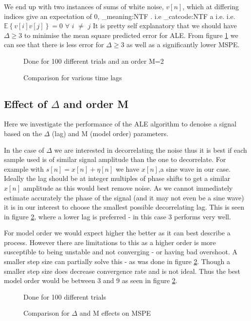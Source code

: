 \documentclass[10pt,twoside,a4paper]{report}
\makeatletter
\newcommand\latinabbrev[1]{
  \peek_meaning:NTF . {%
    #1\@}%
  { \peek_catcode:NTF a {%
      #1.\@ }%
    {#1.\@}}}
\makeatother
\begin{document}
We end up with two instances of sums of white noise, $v[n]$, which at differing indices give an expectation of 0, \latinabbrev{i.e} $\mathbb{E}\left\{ v[i]v[j]\right\}=0$ $\forall$ $i$ $\neq$ $j$ It is pretty self explanatory that we should have $\Delta \geq 3$ to minimise the mean square predicted error for ALE. From figure \ref{fig:3_3a} we can see that there is less error for $\Delta \geq 3$ as well as a significantly lower MSPE.

\begin{figure}[h]
\centering
\resizebox{\textwidth}{!}{}
Done for 100 different trials and an order M=2
\caption{Comparison for various time lags}
\label{fig:3_3a}
\end{figure}

\subsection{Effect of $\Delta$ and order M}
Here we investigate the performance of the ALE algorithm to denoise a signal based on the $\Delta$ (lag) and M (model order) parameters.

In the case of $\Delta$ we are interested in decorrelating the noise thus it is best if each sample used is of similar signal amplitude than the one to decorrelate. For example with $s[n] = x[n]+\eta[n]$ we have $x[n]$,a sine wave in our case. Ideally the lag should be at integer multiples of phase shifts to get a similar $x[n]$ amplitude as this would best remove noise. As we cannot immediately estimate accurately the phase of the signal (and it may not even be a sine wave) it is in our interest to choose the smallest possible decorrelating lag. This is seen in figure \ref{fig:3_3b}, where a lower lag is preferred -  in this case 3 performs very well.

For model order we would expect higher the better as it can best describe a process. However there are limitations to this as a higher order is more susceptible to being unstable and not converging - or having bad overshoot. A smaller step size can partially solve this - as was done in figure \ref{fig:3_3b}. Though a smaller step size does decrease convergence rate and is not ideal. Thus the best model order would be between 3 and 9 as seen in figure \ref{fig:3_3b}.

\begin{figure}[h]
\centering
\resizebox{\textwidth}{!}{}
Done for 100 different trials
\caption{Comparison for $\Delta$ and M effects on MSPE}
\label{fig:3_3b}
\end{figure}
\FloatBarrier
\end{document}
